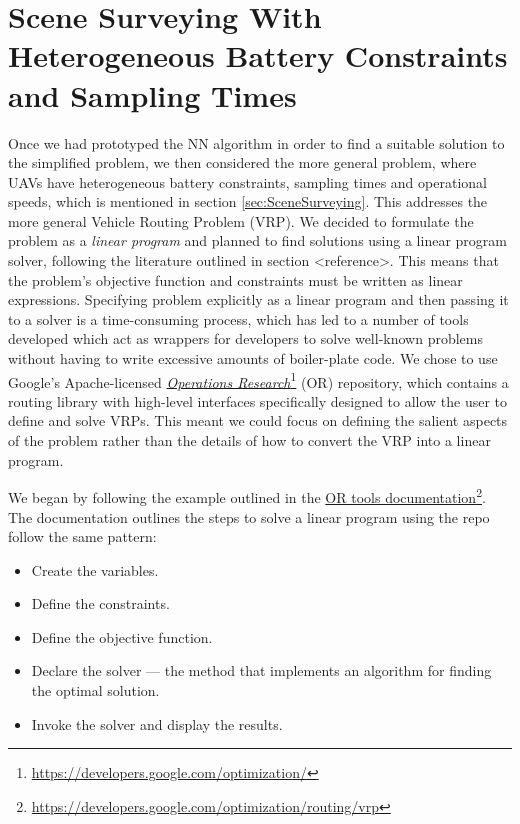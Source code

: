 \section{Scene Surveying With Heterogeneous Battery Constraints and Sampling Times}

Once we had prototyped the NN algorithm in order to find a suitable solution to the simplified problem, we then considered the more general problem, where UAVs have heterogeneous battery constraints, sampling times and operational speeds, which is mentioned in section \ref{sec:SceneSurveying}. This addresses the more general Vehicle Routing Problem (VRP). We decided to formulate the problem as a \textit{linear program} and planned to find solutions using a linear program solver, following the literature outlined in section <reference>. This means that the problem's objective function and constraints must be written as linear expressions.
Specifying problem explicitly as a linear program and then passing it to a solver is a time-consuming process, which has led to a number of tools developed which act as wrappers for developers to solve well-known problems without having to write excessive amounts of boiler-plate code. We chose to use Google's Apache-licensed \href{https://developers.google.com/optimization/}{\textit{Operations Research}}\footnote{\href {https://developers.google.com/optimization/}{https://developers.google.com/optimization/}} (OR) repository, which contains a routing library with high-level interfaces specifically designed to allow the user to define and solve VRPs. This meant we could focus on defining the salient aspects of the problem rather than the details of how to convert the VRP into a linear program.

We began by following the example outlined in the \href{https://developers.google.com/optimization/routing/vrp}{OR tools documentation}\footnote{\href {https://developers.google.com/optimization/routing/vrp}{https://developers.google.com/optimization/routing/vrp}}. The documentation outlines the steps to solve a linear program using the repo follow the same pattern: 
\begin{itemize}
\item Create the variables.
\item Define the constraints.
\item Define the objective function.
\item Declare the solver — the method that implements an algorithm for finding the optimal solution.
\item Invoke the solver and display the results.
\end{itemize}


